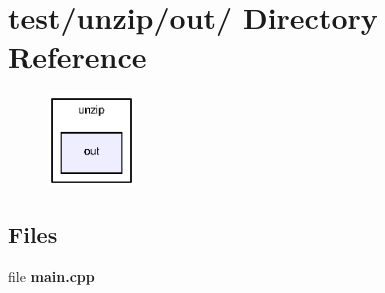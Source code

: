 \section{test/unzip/out/ Directory Reference}
\label{dir_19179835fd1322ffa7e558f0c650ee3a}


\nopagebreak
\begin{figure}[H]
\begin{center}
\leavevmode
\includegraphics[width=65pt]{dir_19179835fd1322ffa7e558f0c650ee3a_dep}
\end{center}
\end{figure}
\subsection*{Files}
\begin{CompactItemize}
\item 
file \textbf{main.cpp}
\end{CompactItemize}
